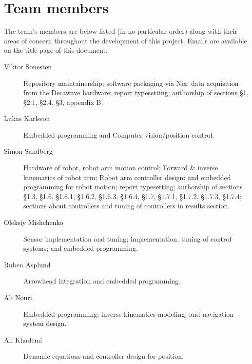 \section{Team members}
The team's members are below listed (in no particular order) along with their areas of concern throughout the development of this project.
Emails are available on the title page of this document.

\begin{description}
\item[Viktor Sonesten] Repository maintainership; software packaging
  via Nix; data acquisition from the Decawave hardware; report
  typesetting; authorship of sections §1, §2.1, §2.4, §3, appendix B.

    \item[Lukas Karlsson]
    Embedded programming and
    Computer vision/position control.

    \item[Simon Sandberg]
    Hardware of robot, robot arm motion control;
    Forward & inverse kinematics of robot arm;
    Robot arm controller design;
    and embedded programming for robot motion; report
    typesetting; authorship of sections §1.3, §1.6, §1.6.1, §1.6.2, §1.6.3, §1.6.4, §1.7, §1.7.1, §1.7.2, §1.7.3, §1.7.4;
    sections about controllers and tuning of controllers in results section.

    \item[Oleksiy Mishchenko]
    Sensor implementation and tuning;
    implementation, tuning of control systems; and
    embedded programming.

    \item[Ruben Asplund]
    Arrowhead integration and embedded programming.

    \item[Ali Nouri]
    Embedded programming;
    inverse kinematics modeling; and
    navigation system design.

    \item[Ali Khademi]
    Dynamic equations and controller design for position.
\end{description}

